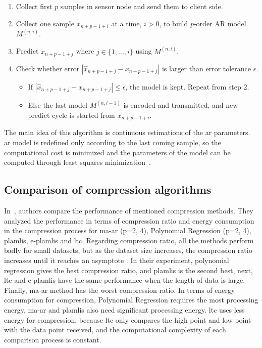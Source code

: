 \begin{enumerate}
    \item Collect first $p$ samples in sensor node and send them to client side.
    \item Collect one sample $x_{n+p-1+i}$ at a time, $i > 0$, to build
    $p$-order
    AR model $M^{(n, i)}$.
    \item Predict $x_{n+p-1+j}$ where $j \in \{1, ..., i\}$ using $M^{(n, i)}$.
    \item Check whether error $ |\hat{x}_{n+p-1+j} - x_{n+p-1+j}|$ is larger
    than error tolerance $\epsilon$.
        \begin{itemize}
            \item If $|\hat{x}_{n+p-1+j} - x_{n+p-1+j}| \leqslant \epsilon$, the
            model is kept. Repeat from step 2.
            \item Else the last model $M^{(n, i-1)}$ is encoded and transmitted,
            and new predict cycle is started from $x_{n+p-1+i}$.
        \end{itemize}
\end{enumerate}
The main idea of this algorithm is continuous estimations of the \acrshort{ar}
parameters. \acrshort{ar} model is redefined only according to the last coming
sample, so the computational cost is minimized and the parameters of the model
can be computed through least squares minimization~\cite{zordan2012compress}.


\subsection{Comparison of compression algorithms}
\label{sec:comparision-lossy}
In~\cite{zordan2014performance}, authors compare the performance of mentioned
compression methods. They analyzed the performance in terms of compression ratio
and energy consumption in the compression process for \acrshort{ma-ar} (p={2,
4}), Polynomial Regression (p={2, 4}), \acrshort{plamlis}, \acrshort{e-plamlis}
and \acrshort{ltc}. Regarding compression ratio, all the methods perform
badly for small datasets, but as the dataset size
increases, the compression ratio increases until it reaches an asymptote . In
their experiment, polynomial regression gives the best compression ratio, and
\acrshort{plamlis} is the second best, next, \acrshort{ltc} and
\acrshort{e-plamlis} have the same performance when the length of data is large.
Finally, \acrshort{ma-ar} method has the worst compression ratio. In terms of
energy consumption for compression, Polynomial Regression requires the most
processing energy, \acrshort{ma-ar} and \acrshort{plamlis} also need significant
processing energy. \acrshort{ltc} uses less energy for compression, because
\acrshort{ltc} only compares the high point and low point with the data point
received, and the computational complexity of each comparison process is
constant.
